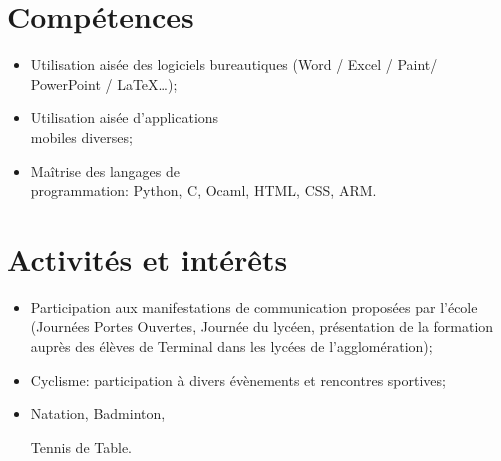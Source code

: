 \documentclass[10pt, oneside, a4paper, titlepage]{article}
\begin{document}
\begin{tcolorbox}
\begin{minipage}[t]{7cm}
\begin{spacing}{0.95}
\begin{tcolorbox}[grow to left by = 0.6cm, colback = gray!25, colframe = white]
                \section*{Compétences}

                \begin{itemize}
                    \item Utilisation aisée des logiciels bureautiques (Word / Excel / Paint/ \\PowerPoint / \LaTeX \ldots);

                    \item Utilisation aisée d’applications \\mobiles diverses;

                    \item Maîtrise des langages de \\programmation: Python, C, Ocaml, HTML, CSS, ARM. \\
                \end{itemize}



                \section*{Activités et intérêts}

                \begin{itemize}
                    \item Participation aux manifestations de communication proposées par l’école (Journées Portes Ouvertes, Journée du lycéen, présentation de la formation auprès des élèves de Terminal dans les lycées de l’agglomération);

                    \item Cyclisme: participation à divers évènements et rencontres sportives;

                    \item Natation, Badminton, 
                    
                    Tennis de Table. \\
                \end{itemize}

            \end{tcolorbox}
        \end{spacing}
        \end{minipage}
        \hspace*{0.4mm}
        \begin{minipage}[t]{12cm}
            \vspace*{-0.5cm}
            \begin{tcolorbox}[grow to right by = 0.6cm, colback = gray!25, colframe = white]

\end{tcolorbox}
\end{minipage}
\end{tcolorbox}
\end{document}
